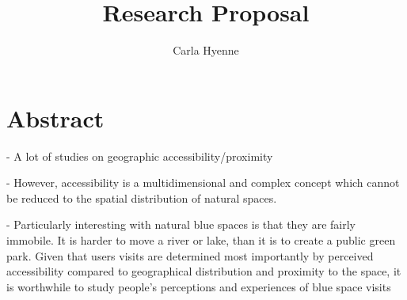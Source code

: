 \documentclass{article}
\title{Research Proposal}
\author{Carla Hyenne}
\date{}
\begin{document}
\maketitle

\tableofcontents 


\section{Abstract}

- A lot of studies on geographic accessibility/proximity

- However, accessibility is a multidimensional and complex concept which cannot be reduced to the spatial distribution of natural spaces. 

- Particularly interesting with natural blue spaces is that they are fairly immobile. It is harder to move a river or lake, than it is to create a public green park. Given that users visits are determined most importantly by perceived accessibility compared to geographical distribution and proximity to the space, it is worthwhile to study people's perceptions and experiences of blue space visits
\end{document}
